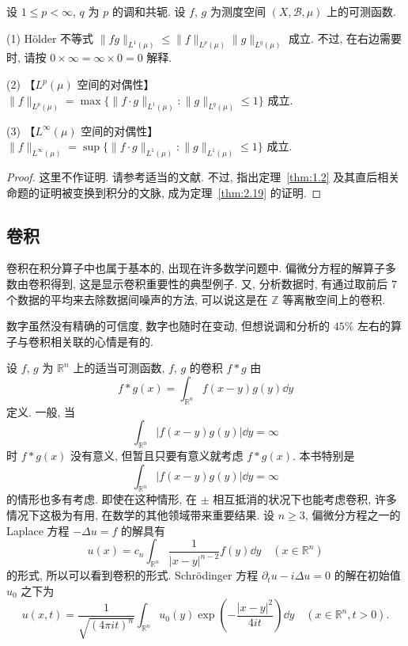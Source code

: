 \begin{theorem}\label{thm:2.19}
设 $1 \leq p < \infty$, $q$ 为 $p$ 的调和共轭. 设 $f$, $g$ 为测度空间 $(X, \mathcal{B}, \mu)$ 上的可测函数.

(1) Hölder 不等式 $\|fg\|_{L^{1}(\mu)} \leq \|f\|_{L^{p}(\mu)}\|g\|_{L^{q}(\mu)}$ 成立. 不过, 在右边需要时, 请按 $0 \times \infty = \infty \times 0 = 0$ 解释.

(2) 【$L^{p}(\mu)$ 空间的对偶性】 $\|f\|_{L^{p}(\mu)} = \max\{\|f \cdot g\|_{L^{1}(\mu)} : \|g\|_{L^{q}(\mu)} \leq 1\}$ 成立.

(3) 【$L^{\infty}(\mu)$ 空间的对偶性】 $\|f\|_{L^{\infty}(\mu)} = \sup\{\|f \cdot g\|_{L^{1}(\mu)} : \|g\|_{L^{1}(\mu)} \leq 1\}$ 成立.
\end{theorem}

\begin{proof}
这里不作证明. 请参考适当的文献. 不过, 指出定理~\ref{thm:1.2} 及其直后相关命题的证明被变换到积分的文脉, 成为定理~\ref{thm:2.19} 的证明.
\end{proof}

\subsection*{卷积}

卷积在积分算子中也属于基本的, 出现在许多数学问题中. 偏微分方程的解算子多数由卷积得到, 这是显示卷积重要性的典型例子. 又, 分析数据时, 有通过取前后 $7$ 个数据的平均来去除数据间噪声的方法, 可以说这是在 $\mathbb{Z}$ 等离散空间上的卷积.

数字虽然没有精确的可信度, 数字也随时在变动, 但想说调和分析的 $45\%$ 左右的算子与卷积相关联的心情是有的.

设 $f$, $g$ 为 $\mathbb{R}^{n}$ 上的适当可测函数, $f$, $g$ 的卷积 $f*g$ 由
\[
f * g(x) = \int_{\mathbb{R}^{n}}f(x - y)g(y)\dd y
\]
定义. 一般, 当
\[
\int_{\mathbb{R}^{n}}|f(x - y)g(y)|\dd y = \infty
\]
时 $f * g(x)$ 没有意义, 但暂且只要有意义就考虑 $f * g(x)$. 本书特别是
\[
\int_{\mathbb{R}^{n}}|f(x - y)g(y)|\dd y = \infty
\]
的情形也多有考虑. 即使在这种情形, 在 $\pm$ 相互抵消的状况下也能考虑卷积, 许多情况下这极为有用, 在数学的其他领域带来重要结果. 设 $n \geq 3$, 偏微分方程之一的 Laplace 方程 $-\Delta u = f$ 的解具有
\[
u(x) = c_{n}\int_{\mathbb{R}^{n}}\frac{1}{|x - y|^{n-2}}f(y)\dd y \quad (x \in \mathbb{R}^{n})
\]
的形式, 所以可以看到卷积的形式. Schr\"odinger 方程 $\partial_{t}u - i\Delta u = 0$ 的解在初始值 $u_{0}$ 之下为
\[
u(x, t) = \frac{1}{\sqrt{(4\pi i t)^{n}}}\int_{\mathbb{R}^{n}}u_{0}(y)\exp\left(-\frac{|x - y|^{2}}{4it}\right)\dd y \quad (x \in \mathbb{R}^{n}, t > 0).
\]

